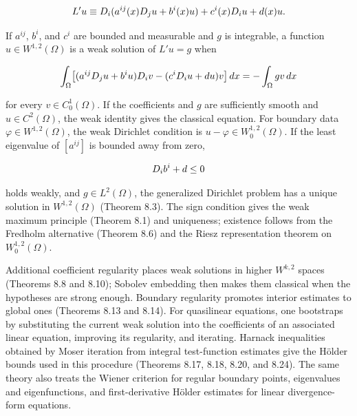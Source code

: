 \begin{equation}\label{gt.eq1.6}\dcref{(1.6)}\group{chapter-1}\source{gilbarg-trudinger:page-0017}
L'u \equiv D_i(a^{ij}(x)D_j u + b^i(x)u) + c^i(x)D_i u + d(x)u.
\end{equation}

If $a^{ij}$, $b^i$, and $c^i$ are bounded and measurable and $g$ is integrable,
a function $u\in W^{1,2}(\Omega)$ is a weak solution of $L'u=g$ when

\begin{equation}\label{gt.eq1.7}\dcref{(1.4)}\group{chapter-1}\source{gilbarg-trudinger:page-0017}
\int_{\Omega} \bigl[(a^{ij}D_j u+b^i u)D_i v-(c^i D_i u+d u)v\bigr]\,dx
=-\int_{\Omega} g v\,dx
\end{equation}

for every $v\in C_0^1(\Omega)$. If the coefficients and $g$ are sufficiently
smooth and $u\in C^2(\Omega)$, the weak identity gives the classical equation.
For boundary data $\varphi\in W^{1,2}(\Omega)$, the weak Dirichlet condition is
$u-\varphi\in W_0^{1,2}(\Omega)$. If the least eigenvalue of $[a^{ij}]$ is
bounded away from zero,

\begin{equation}\label{gt.eq1.8}\dcref{(1.5)}\group{chapter-1}\source{gilbarg-trudinger:page-0017}
D_i b^i+d\leq 0
\end{equation}

holds weakly, and $g\in L^2(\Omega)$, the generalized Dirichlet problem has a
unique solution in $W^{1,2}(\Omega)$ (Theorem 8.3). The sign condition gives the
weak maximum principle (Theorem 8.1) and uniqueness; existence follows from the
Fredholm alternative (Theorem 8.6) and the Riesz representation theorem on
$W_0^{1,2}(\Omega)$.

Additional coefficient regularity places weak solutions in higher $W^{k,2}$
spaces (Theorems 8.8 and 8.10); Sobolev embedding then makes them classical when
the hypotheses are strong enough. Boundary regularity promotes interior estimates
to global ones (Theorems 8.13 and 8.14). For quasilinear equations, one bootstraps
by substituting the current weak solution into the coefficients of an associated
linear equation, improving its regularity, and iterating. Harnack inequalities
obtained by Moser iteration from integral test-function estimates give the
H\"older bounds used in this procedure (Theorems 8.17, 8.18, 8.20, and 8.24).
The same theory also treats the Wiener criterion for regular boundary points,
eigenvalues and eigenfunctions, and first-derivative H\"older estimates for linear
divergence-form equations.

